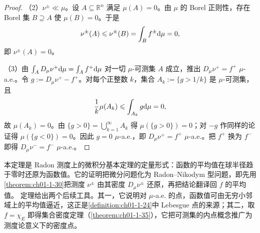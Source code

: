 \documentclass[../../main.tex]{subfiles}%
\begin{document}
\begin{proof}
（2）$\nu^{\pm}\ll\mu$。设 $A\subseteq\mathbb{R}^n$ 满足 $\mu(A)=0$。由 $\mu$ 的 Borel 正则性，存在 Borel 集 $B\supseteq A$ 使 $\mu(B)=0$。于是
\begin{align*}
\nu^{\pm}(A)\leqslant\nu^{\pm}(B)=\int_B f^{\pm}\mathrm{d}\mu=0 ,
\end{align*}
即 $\nu^{\pm}(A)=0$。

（3）由 $\int_A D_{\mu}\nu^{+}\mathrm{d}\mu=\int_A f^{+}\mathrm{d}\mu$ 对一切 $\mu$-可测集 $A$ 成立，推出 $D_{\mu}\nu^{+}=f^{+}$ $\mu$-a.e.。令 $g:=D_{\mu}\nu^{+}-f^{+}$。对每个正整数 $k$，集合 $A_k:=\{g>1/k\}$ 是 $\mu$-可测集，且
\begin{align*}
\frac{1}{k}\mu(A_k)\leqslant\int_{A_k}g\mathrm{d}\mu=0 ,
\end{align*}
故 $\mu(A_k)=0$。由 $\{g>0\}=\bigcup_{k=1}^{\infty}A_k$ 得 $\mu(\{g>0\})=0$；对 $-g$ 作同样的论证得 $\mu(\{g<0\})=0$。因此 $g=0$ $\mu$-a.e.，即 $D_{\mu}\nu^{+}=f^{+}$ $\mu$-a.e.。把 $f^{+}$ 换为 $f^{-}$ 即得 $D_{\mu}\nu^{-}=f^{-}$ $\mu$-a.e.。
\end{proof}

\begin{remark}\label{remark:ch01-thm-1-32-动机}
本定理是 Radon 测度上的微积分基本定理的定量形式：函数的平均值在球半径趋于零时还原为函数值。它的证明把微分问题化为 Radon--Nikodym 型问题，即先用\cref{theorem:ch01-1-30}把测度 $\nu^{\pm}$ 由其密度 $D_{\mu}\nu^{\pm}$ 还原，再把结论翻译回 $f$ 的平均值。%
定理给出两个后续工具。其一，它说明对 $\mu$-a.e. 的点，函数值可由无穷小邻域上的平均值逼近，这正是\cref{definition:ch01-1-24}中 Lebesgue 点的来源；其二，取 $f=\chi_E$ 即得集合密度定理（\cref{theorem:ch01-1-35}），它把可测集的内点概念推广为测度论意义下的密度点。%
\end{remark}
\end{document}

